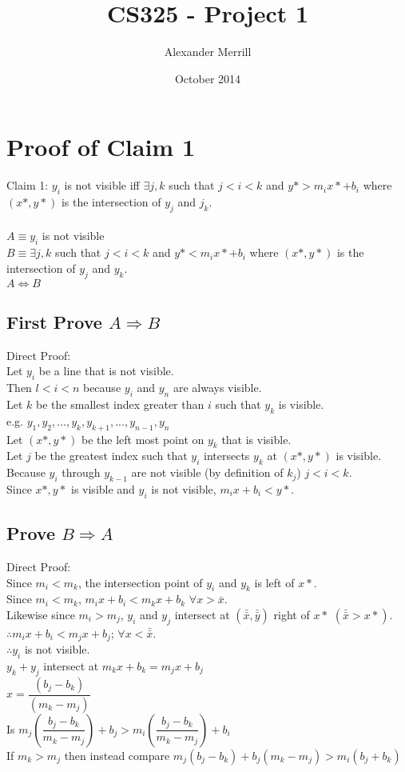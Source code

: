 \documentclass{article}
\title{CS325 - Project 1}
\author{Alexander Merrill}
\date{October 2014}
\begin{document}
\maketitle

\section*{Proof of Claim 1}

Claim 1: $y_i$ is not visible iff $\exists j,k$ such that $j < i < k$ and $y* > m_i x* + b_i$ where $(x*,y*)$ is the intersection of $y_j$ and $j_k$.\\
\\
$A \equiv y_i$ is not visible\\
$B \equiv \exists j,k$ such that $j < i < k$ and $y* < m_i x* + b_i$ where $(x*,y*)$ is the intersection of $y_j$ and $y_k$.\\
$A \Leftrightarrow B$

\subsection*{First Prove $A \Rightarrow B$}
Direct Proof:\\
Let $y_i$ be a line that is not visible.\\
Then $l < i < n$ because $y_i$ and $y_n$ are always visible.\\
Let $k$ be the smallest index greater than $i$ such that $y_k$ is visible.\\
e.g. $y_1,y_2,...,y_k,y_{k+1},...,y_{n-1},y_n$\\
Let $(x*,y*)$ be the left most point on $y_k$ that is visible.\\
Let $j$ be the greatest index such that $y_i$ intersects $y_k$ at $(x*,y*)$ is visible.\\
Because $y_i$ through $y_{k-1}$ are not visible (by definition of $k_j$) $j < i < k$.\\
Since $x*,y*$ is visible and $y_i$ is not visible, $m_i x + b_i < y*$.

\subsection*{Prove $B \Rightarrow A$}
Direct Proof:\\
Since $m_i < m_k$, the intersection point of $y_i$ and $y_k$ is left of $x*$.\\
Since $m_i < m_k$, $m_i x + b_i < m_k x + b_k$ $\forall{x > \bar{x}}$.\\
Likewise since $m_i > m_j$, $y_i$ and $y_j$ intersect at $(\bar{\bar{x}}, \bar{\bar{y}})$ right of $x*$ $(\bar{\bar{x}} > x*)$.\\
$\therefore m_i x + b_i < m_j x + b_j$; $\forall{x < \bar{\bar{x}}}$.\\
$\therefore y_i$ is not visible.\\
$y_k + y_j$ intersect at $m_k x + b_k = m_j x + b_j$\\
$x = \dfrac{(b_j - b_k)}{(m_k - m_j)}$\\
Is $m_j \left( \dfrac{b_j - b_k}{m_k - m_j}\right) + b_j > m_i \left(\dfrac{b_j - b_k}{m_k - m_j}\right) + b_i$\\
If $m_k > m_j$ then instead compare $m_j (b_j - b_k) + b_j (m_k - m_j) > m_i (b_j + b_k)$
\end{document}
